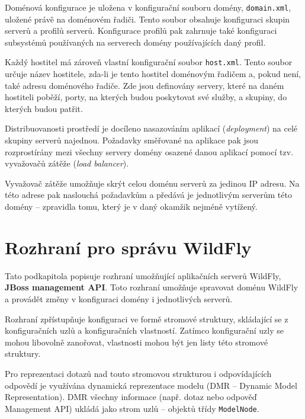 Doménová konfigurace je uložena v konfigurační souboru domény, {\tt domain.xml}, uložené právě na doménovém řadiči.
Tento soubor obsahuje konfiguraci skupin serverů a profilů serverů.
Konfigurace profilů pak zahrnuje také konfiguraci subsystémů používaných na serverech domény používajících daný profil.
\cite{jbossDomainSetup}

Každý hostitel má zároveň vlastní konfigurační soubor {\tt host.xml}.
Tento soubor určuje název hostitele, zda-li je tento hostitel doménovým řadičem a, pokud není, také adresu doménového řadiče.
Zde jsou definovány servery, které na daném hostiteli poběží, porty, na kterých budou poskytovat své služby, a skupiny, do kterých budou patřit.
\cite{jbossDomainSetup}

Distribuovanosti prostředí je docíleno nasazováním aplikací ({\it deployment}) na celé skupiny serverů najednou.
Požadavky směřované na aplikace pak jsou rozprostírány mezi všechny servery domény osazené danou aplikací pomocí tzv. vyvažovačů zátěže ({\it load balancer}).
\cite{jbossLoadBalancing}

Vyvažovač zátěže umožňuje skrýt celou doménu serverů za jedinou IP adresu.
Na této adrese pak naslouchá požadavkům a předává je jednotlivým serverům této domény -- zpravidla tomu, který je v daný okamžik nejméně vytížený.
\cite{jbossLoadBalancing}

\section{Rozhraní pro správu WildFly} \label{managementAPI}

Tato podkapitola popisuje rozhraní umožňující aplikačních serverů WildFly, {\bf JBoss management API}.
Toto rozhraní umožňuje spravovat doménu WildFly a provádět změny v konfiguraci domény i jednotlivých serverů.
\cite{jbossDetypedManagement}

Rozhraní zpřístupňuje konfiguraci ve formě stromové struktury, skládající se z konfiguračních uzlů a konfiguračních vlastností.
Zatímco konfigurační uzly se mohou libovolně zanořovat, vlastnosti mohou být jen listy této stromové struktury.
\cite{jbossDetypedManagement}

Pro reprezentaci dotazů nad touto stromovou strukturou i odpovídajících odpovědí je využívána dynamická reprezentace modelu (DMR -- Dynamic Model Representation).
DMR všechny informace (např. dotaz nebo odpověď Management API) ukládá jako strom uzlů -- objektů třídy {\tt ModelNode}.
\cite{jbossDetypedManagement}

